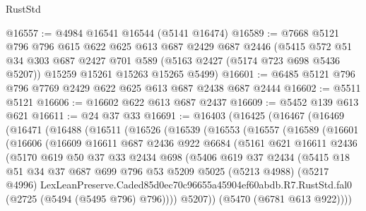 \begin{lexlean}{RustStd}
\begin{coremodule}
@16557 := @4984 @16541 @16544 (@5141 @16474)
@16589 := @7668
    @5121
    @796
    @796
    @615
    @622
    @625
    @613
    @687
    @2429
    @687
    @2446
    (@5415
      @572
      @51
      @34
      @303
      @687
      @2427
      @701
      @589
      (@5163 @2427 (@5174 @723 @698 @5436 @5207))
      @15259
      @15261
      @15263
      @15265
      @5499)
@16601 := @6485 @5121 @796 @796 @7769 @2429 @622 @625 @613 @687 @2438 @687 @2444
@16602 := @5511 @5121
@16606 := @16602 @622 @613 @687 @2437
@16609 := @5452 @139 @613 @621
@16611 := @24 @37 @33
@16691 := @16403
    (@16425
      (@16467
        (@16469
          (@16471
            (@16488
              (@16511
                (@16526
                  (@16539
                    (@16553
                      (@16557
                        (@16589
                          (@16601
                            (@16606
                              (@16609
                                @16611
                                @687
                                @2436
                                @922
                                @6684
                                (@5161
                                  @621
                                  @16611
                                  @2436
                                  (@5170
                                    @619
                                    @50
                                    @37
                                    @33
                                    @2434
                                    @698
                                    (@5406
                                      @619
                                      @37
                                      @2434
                                      (@5415
                                        @18
                                        @51
                                        @34
                                        @37
                                        @687
                                        @699
                                        @796
                                        @53
                                        @5209
                                        @5025
                                        (@5213 @4988)
                                        (@5217 @4996)
                                        LexLeanPreserve.Caded85d0ec70c96655a45904ef60abdb.R7.RustStd.fal0
                                        (@2725 (@5494 (@5495 @796) @796))))
                                    @5207))
                                (@5470 (@6781 @613 @922))))

\end{coremodule}
\end{lexlean}

